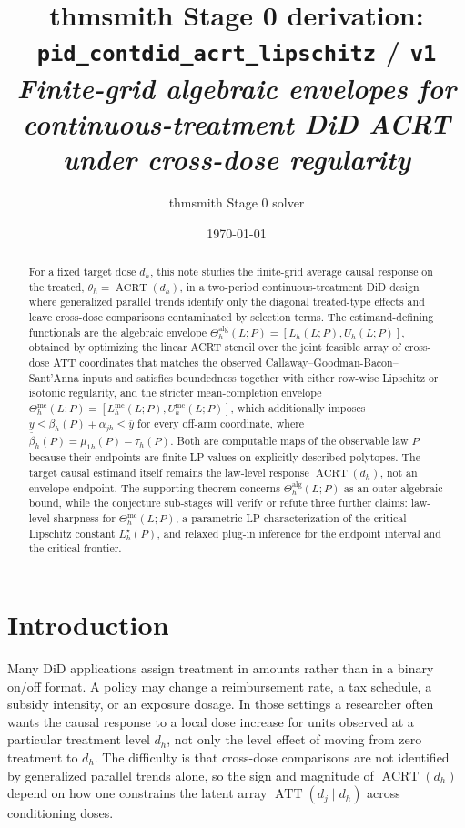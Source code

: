 \documentclass[11pt]{article}
\title{thmsmith Stage 0 derivation: \texttt{pid\_contdid\_acrt\_lipschitz} / \texttt{v1}%
  \\ \large\textit{Finite-grid algebraic envelopes for continuous-treatment DiD ACRT under cross-dose regularity}}
\author{thmsmith Stage 0 solver}
\date{\today}
\theoremstyle{definition}
\theoremstyle{plain}
\theoremstyle{remark}
\begin{document}
\maketitle


\begin{abstract}
For a fixed target dose \(d_h\), this note studies the finite-grid average
causal response on the treated,
\(\theta_h=\operatorname{ACRT}(d_h)\), in a two-period continuous-treatment
DiD design where generalized parallel trends identify only the diagonal
treated-type effects and leave cross-dose comparisons contaminated by
selection terms.  The estimand-defining functionals are the algebraic
envelope \(\Theta_h^{\mathrm{alg}}(L;P)=[L_h(L;P),U_h(L;P)]\), obtained by
optimizing the linear ACRT stencil over the joint feasible array of cross-dose
ATT coordinates that matches the observed
Callaway--Goodman-Bacon--Sant'Anna inputs and satisfies boundedness together
with either row-wise Lipschitz or isotonic regularity, and the stricter
mean-completion envelope
\(\Theta_h^{\mathrm{mc}}(L;P)=[L_h^{\mathrm{mc}}(L;P),U_h^{\mathrm{mc}}(L;P)]\),
which additionally imposes
\(\underline y\le \beta_h(P)+\alpha_{jh}\le\overline y\) for every off-arm
coordinate, where \(\beta_h(P)=\mu_{1h}(P)-\tau_h(P)\).  Both are computable
maps of the observable law \(P\) because their endpoints are finite LP values
on explicitly described polytopes.  The target causal estimand itself remains
the law-level response \(\operatorname{ACRT}(d_h)\), not an envelope endpoint.
The supporting theorem concerns \(\Theta_h^{\mathrm{alg}}(L;P)\) as an outer
algebraic bound, while the conjecture sub-stages will verify or refute three
further claims: law-level sharpness for \(\Theta_h^{\mathrm{mc}}(L;P)\), a
parametric-LP characterization of the critical Lipschitz constant
\(L_h^\star(P)\), and relaxed plug-in inference for the endpoint interval and
the critical frontier.
\end{abstract}

\section{Introduction}
Many DiD applications assign treatment in amounts rather than in a binary
on/off format.  A policy may change a reimbursement rate, a tax schedule, a
subsidy intensity, or an exposure dosage.  In those settings a researcher
often wants the causal response to a local dose increase for units observed at
a particular treatment level \(d_h\), not only the level effect of moving from
zero treatment to \(d_h\).  The difficulty is that cross-dose comparisons are
not identified by generalized parallel trends alone, so the sign and magnitude
of \(\operatorname{ACRT}(d_h)\) depend on how one constrains the latent array
\(\operatorname{ATT}(d_j\mid d_h)\) across conditioning doses.
\end{document}
